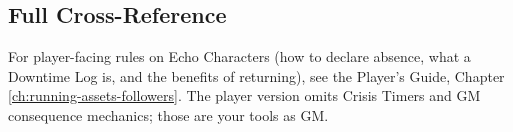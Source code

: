 \subsection{Full Cross-Reference}
For player-facing rules on Echo Characters (how to declare absence, what a Downtime Log is, and the benefits of returning), see the Player's Guide, Chapter \ref{ch:running-assets-followers}. The player version omits Crisis Timers and GM consequence mechanics; those are your tools as GM.